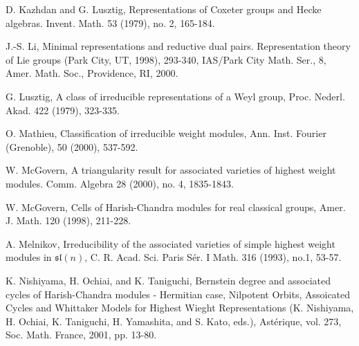 \documentclass{amsart}[12pt]
\numberwithin{equation}{section}
\begin{document}
\begin{thebibliography}{99}
D. Kazhdan and G. Lusztig,  Representations of Coxeter groups and Hecke algebras. Invent. Math. 53 (1979), no. 2, 165-184.


J.-S. Li, Minimal representations and reductive dual pairs. Representation theory of Lie groups (Park City, UT, 1998), 293-340, IAS/Park City Math. Ser., 8, Amer. Math. Soc., Providence, RI, 2000.

%


G. Lusztig, A class of irreducible representations of a Weyl group, Proc. Nederl.
Akad. 422 (1979), 323-335.

O. Mathieu,   Classification of irreducible weight modules,   Ann. Inst. Fourier (Grenoble),  50  (2000), 537-592.




 W. McGovern, A triangularity result for associated varieties of highest weight modules. Comm. Algebra 28 (2000), no. 4, 1835-1843.

 W. McGovern, Cells of Harish-Chandra modules for real classical groups, Amer. J. Math. 120
(1998), 211-228.

A. Melnikov,  Irreducibility of the associated varieties of simple highest weight modules in $\mathfrak{sl}(n)$, C. R. Acad. Sci. Paris S\'{e}r. I Math.  316  (1993),  no.1, 53-57.




 K. Nishiyama, H. Ochiai, and K. Taniguchi, Bernstein degree and associated cycles of Harish-Chandra
modules - Hermitian case, Nilpotent Orbits, Assoicated Cycles and Whittaker Models for Highest
Wieght Representations (K. Nishiyama, H. Ochiai, K. Taniguchi, H. Yamashita, and S. Kato, eds.),
Ast\'{e}rique, vol. 273, Soc. Math. France, 2001, pp. 13-80.





\end{thebibliography}
\end{document}
